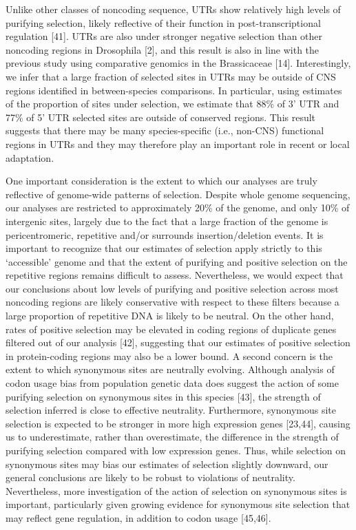 Unlike other classes of noncoding sequence, UTRs show relatively high levels of purifying selection, likely reflective of their function in post-transcriptional regulation [41]. UTRs are also under stronger negative selection than other noncoding regions in Drosophila [2], and this result is also in line with the previous study using comparative genomics in the Brassicaceae [14]. Interestingly, we infer that a large fraction of selected sites in UTRs may be outside of CNS regions identified in between-species comparisons. In particular, using estimates of the proportion of sites under selection, we estimate that 88\% of 3’ UTR and 77\% of 5’ UTR selected sites are outside of conserved regions.  This result suggests that there may be many species-specific (i.e., non-CNS) functional regions in UTRs and they may therefore play an important role in recent or local adaptation.

One important consideration is the extent to which our analyses are truly reflective of genome-wide patterns of selection. Despite whole genome sequencing, our analyses are restricted to approximately 20\% of the genome, and only 10\% of intergenic sites, largely due to the fact that a large fraction of the genome is pericentromeric, repetitive and/or surrounds insertion/deletion events. It is important to recognize that our estimates of selection apply strictly to this ‘accessible’ genome and that the extent of purifying and positive selection on the repetitive regions remains difficult to assess. Nevertheless, we would expect that our conclusions about low levels of purifying and positive selection across most noncoding regions are likely conservative with respect to these filters because a large proportion of repetitive DNA is likely to be neutral. On the other hand, rates of positive selection may be elevated in coding regions of duplicate genes filtered out of our analysis [42], suggesting that our estimates of positive selection in protein-coding regions may also be a lower bound.   
A second concern is the extent to which synonymous sites are neutrally evolving. Although analysis of codon usage bias from population genetic data does suggest the action of some purifying selection on synonymous sites in this species [43], the strength of selection inferred is close to effective neutrality. Furthermore, synonymous site selection is expected to be stronger in more high expression genes [23,44], causing us to underestimate, rather than overestimate, the difference in the strength of purifying selection compared with low expression genes. Thus, while selection on synonymous sites may bias our estimates of selection slightly downward, our general conclusions are likely to be robust to violations of neutrality. Nevertheless, more investigation of the action of selection on synonymous sites is important, particularly given growing evidence for synonymous site selection that may reflect gene regulation, in addition to codon usage [45,46].


